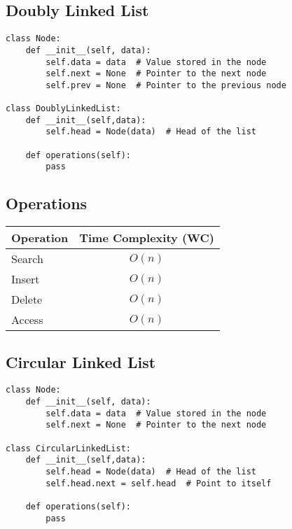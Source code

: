 \subsection{Doubly Linked List}
\begin{algo}
\begin{lstlisting}
class Node:
    def __init__(self, data):
        self.data = data  # Value stored in the node
        self.next = None  # Pointer to the next node
        self.prev = None  # Pointer to the previous node

class DoublyLinkedList:
    def __init__(self,data):
        self.head = Node(data)  # Head of the list

    def operations(self):
        pass
\end{lstlisting}
\end{algo}

\subsection{Operations}
\begin{summary}
    \begin{center}
        \begin{tabular}{lc}
            \toprule
            \textbf{Operation} & \textbf{Time Complexity (WC)} \\
            \midrule
            Search & $O(n)$ \\
            Insert & $O(n)$ \\
            Delete & $O(n)$ \\
            Access & $O(n)$ \\
            \bottomrule
        \end{tabular}
    \end{center}
\end{summary}
\newpage

\subsection{Circular Linked List}
\begin{algo}
\begin{lstlisting}
class Node:
    def __init__(self, data):
        self.data = data  # Value stored in the node
        self.next = None  # Pointer to the next node

class CircularLinkedList:
    def __init__(self,data):
        self.head = Node(data)  # Head of the list
        self.head.next = self.head  # Point to itself

    def operations(self):
        pass
\end{lstlisting}
\end{algo}  

